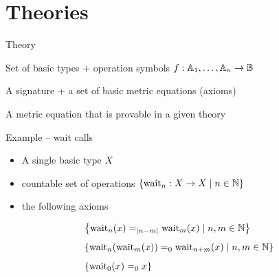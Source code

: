 \documentclass{beamer}
\begin{document}
\section{Theories}

\begin{frame}{Theory}

        \begin{definition}[Signature]
                Set of basic types + operation symbols
                $f : \mathbb{A}_1, \dots, \mathbb{A}_n \to \mathbb{B}$
        \end{definition}


        \bigskip
        \pause
        \begin{definition}[Theory]
                A signature + a set of basic metric equations (axioms)
        \end{definition}


        \bigskip
        \pause
        \begin{definition}[Theorem]
                A metric equation that is provable in a given theory
        \end{definition}
\end{frame}

\begin{frame}{Example -- wait calls}

        \begin{itemize}
                \item A single basic type $X$
                        \\[7pt]
                \item countable set of operations $\left \{ \text{wait}_n : X \to X \mid n \in \mathbb{N} \right \}$
                        \\[7pt]
                \item the following axioms
        \end{itemize}
        \vspace{-0.4cm}
        \begin{align*}
                & \left \{ \text{wait}_n(x) =_{| n - m|} \text{wait}_m(x) \mid n,m \in \mathbb{N} \right \}
                \\[5pt]
                & \left \{ \text{wait}_n(\text{wait}_m(x)) =_0 \text{wait}_{n+m}(x) \mid n,m \in \mathbb{N} \right \}
                \\[5pt]
                & \left \{ \text{wait}_0(x) =_0 x \right \} 
        \end{align*}
\end{frame}
\end{document}

